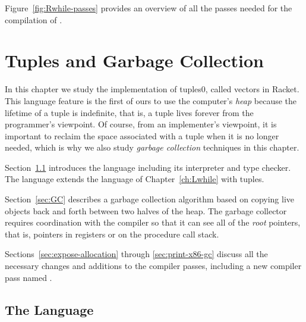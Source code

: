\documentclass[7x10]{TimesAPriori_MIT}%
\def\racketEd{0}
\def\edition{1}
\newcommand{\racket}[1]{{\if\edition\racketEd{#1}\fi}}
\begin{document}
Figure~\ref{fig:Rwhile-passes} provides an overview of all the passes needed
for the compilation of \LangLoop{}.






\chapter{Tuples and Garbage Collection}
\label{ch:Lvec}


In this chapter we study the implementation of
tuples\racket{, called vectors in Racket}.
%
This language feature is the first of ours to use the computer's
\emph{heap} because the lifetime of a tuple is
indefinite, that is, a tuple lives forever from the programmer's
viewpoint. Of course, from an implementer's viewpoint, it is important
to reclaim the space associated with a tuple when it is no longer
needed, which is why we also study \emph{garbage collection}
 techniques in this chapter.

Section~\ref{sec:r3} introduces the \LangVec{} language including its
interpreter and type checker. The \LangVec{} language extends the \LangLoop{}
language of Chapter~\ref{ch:Lwhile} with tuples.

Section~\ref{sec:GC} describes a garbage collection algorithm based on
copying live objects back and forth between two halves of the
heap. The garbage collector requires coordination with the compiler so
that it can see all of the \emph{root} pointers, that is, pointers in
registers or on the procedure call stack.

Sections~\ref{sec:expose-allocation} through \ref{sec:print-x86-gc}
discuss all the necessary changes and additions to the compiler
passes, including a new compiler pass named .

\section{The \LangVec{} Language}
\label{sec:r3}
\end{document}
